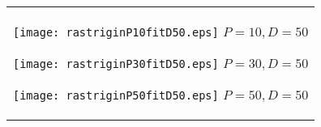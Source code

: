 \documentclass[a4paper,11pt,oneside,openany]{jsbook}
\begin{document}
\begin{figure}[htbp]
  \begin{center}
    \begin{tabular}{c}


      \begin{minipage}{0.33\hsize}
        \begin{center}
          \texttt{[image: rastriginP10fitD50.eps]}
          \hspace{1.2cm} $P=10, D=50
$        \end{center}
      \end{minipage}

      \begin{minipage}{0.33\hsize}
        \begin{center}
          \texttt{[image: rastriginP30fitD50.eps]}
          \hspace{1.2cm} $P=30, D=50
$        \end{center}
      \end{minipage}

      \begin{minipage}{0.33\hsize}
        \begin{center}
          \texttt{[image: rastriginP50fitD50.eps]}
          \hspace{1.2cm} $P=50, D=50
$        \end{center}
      \end{minipage}
    \end{tabular}
  \end{center}
\end{figure}
\end{document}
